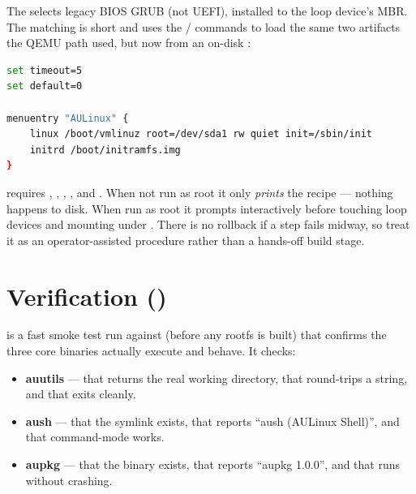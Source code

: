 The  selects legacy BIOS GRUB (not UEFI), installed to
the loop device's MBR. The matching  is short and
uses the / commands to load the same two artifacts
the QEMU path used, but now from an on-disk :

\begin{lstlisting}[language=bash, caption={bootloader/grub.cfg --- the AULinux boot menu entry}]
set timeout=5
set default=0

menuentry "AULinux" {
    linux /boot/vmlinuz root=/dev/sda1 rw quiet init=/sbin/init
    initrd /boot/initramfs.img
}
\end{lstlisting}

\begin{warnbox}
 requires , , ,
, and . When not run as root it only
\emph{prints} the recipe --- nothing happens to disk. When run as root it
prompts interactively before touching loop devices and mounting under
. There is no rollback if a step fails midway, so treat it as an
operator-assisted procedure rather than a hands-off build stage.
\end{warnbox}

\section{Verification ()}

 is a fast smoke test run against  (before any
rootfs is built) that confirms the three core binaries actually execute and
behave. It checks:

\begin{itemize}
  \item \textbf{auutils} --- that  returns the real working
        directory, that  round-trips a string, and that 
        exits cleanly.
  \item \textbf{aush} --- that the  symlink exists, that
         reports ``aush (AULinux Shell)'', and that
        command-mode  works.
  \item \textbf{aupkg} --- that the binary exists, that 
        reports ``aupkg 1.0.0'', and that  runs without
        crashing.
\end{itemize}

